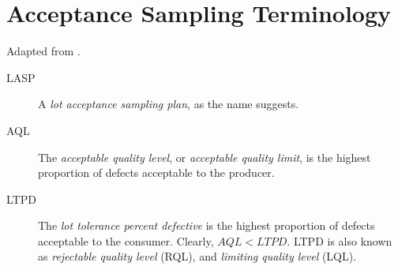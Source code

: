 \section{Acceptance Sampling Terminology}
Adapted from \cite{natrella_nist/sematech_2010}.
\begin{description}
\item [LASP] A \emph{lot acceptance sampling plan}, as the name suggests. 
\item [AQL] The \emph{acceptable quality level}, or \emph{acceptable quality limit}, is the highest proportion of defects acceptable to the producer. 
\item [LTPD] The \emph{lot tolerance percent defective} is the highest proportion of defects acceptable to the consumer. Clearly, $AQL<LTPD$. LTPD is also known as \emph{rejectable quality level} (RQL), and \emph{ limiting quality level} (LQL). 
\end{description}

